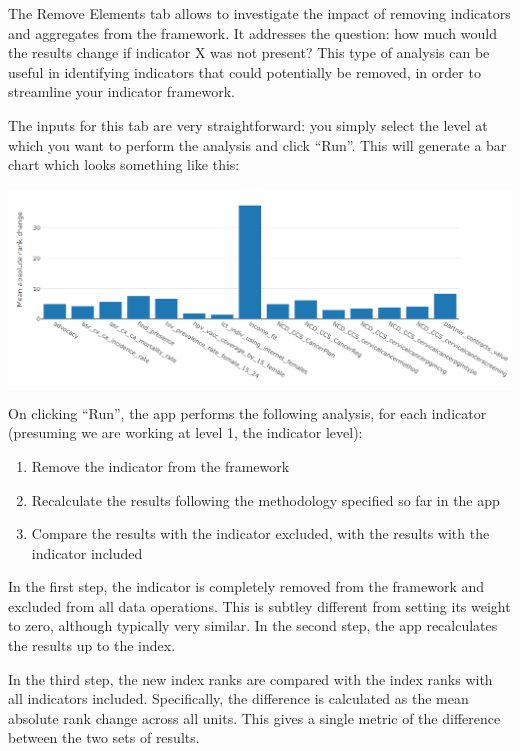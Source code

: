 \documentclass[
  letterpaper,
  DIV=11,
  numbers=noendperiod]{scrreprt}
\providecommand{\tightlist}{%
  \setlength{\itemsep}{0pt}\setlength{\parskip}{0pt}}\usepackage{longtable,booktabs,array}
\begin{document}
The Remove Elements tab allows to investigate the impact of removing
indicators and aggregates from the framework. It addresses the question:
how much would the results change if indicator X was not present? This
type of analysis can be useful in identifying indicators that could
potentially be removed, in order to streamline your indicator framework.

The inputs for this tab are very straightforward: you simply select the
level at which you want to perform the analysis and click ``Run''. This
will generate a bar chart which looks something like this:

\includegraphics[width=1\textwidth,height=\textheight]{figs/remove_elements_1.png}

On clicking ``Run'', the app performs the following analysis, for each
indicator (presuming we are working at level 1, the indicator level):

\begin{enumerate}
\def\labelenumi{\arabic{enumi}.}
\tightlist
\item
  Remove the indicator from the framework
\item
  Recalculate the results following the methodology specified so far in
  the app
\item
  Compare the results with the indicator excluded, with the results with
  the indicator included
\end{enumerate}

In the first step, the indicator is completely removed from the
framework and excluded from all data operations. This is subtley
different from setting its weight to zero, although typically very
similar. In the second step, the app recalculates the results up to the
index.

In the third step, the new index ranks are compared with the index ranks
with all indicators included. Specifically, the difference is calculated
as the mean absolute rank change across all units. This gives a single
metric of the difference between the two sets of results.
\end{document}
